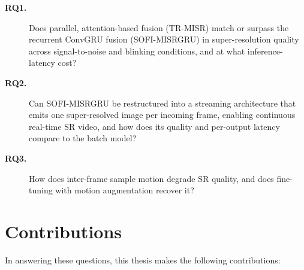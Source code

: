 \begin{description}
  \item[\textbf{RQ1.}] Does parallel, attention-based fusion (TR-MISR) match or surpass the
    recurrent ConvGRU fusion (SOFI-MISRGRU) in super-resolution quality across signal-to-noise
    and blinking conditions, and at what inference-latency cost?
  \item[\textbf{RQ2.}] Can SOFI-MISRGRU be restructured into a streaming architecture that
    emits one super-resolved image per incoming frame, enabling continuous real-time SR video,
    and how does its quality and per-output latency compare to the batch model?
  \item[\textbf{RQ3.}] How does inter-frame sample motion degrade SR quality, 
  and does fine-tuning with motion augmentation recover it?
\end{description}

\section{Contributions}
\label{sec:contributions}

In answering these questions, this thesis makes the following contributions:

